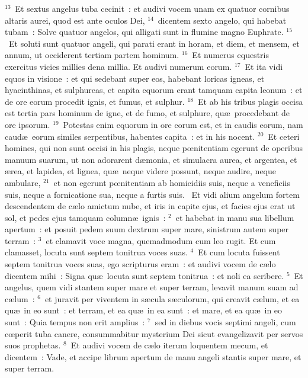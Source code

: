 ${}^{13}$~Et sextus angelus tuba cecinit~: et audivi vocem unam ex quatuor cornibus altaris aurei, quod est ante oculos Dei,
${}^{14}$~dicentem sexto angelo, qui habebat tubam~: Solve quatuor angelos, qui alligati sunt in flumine magno Euphrate.
${}^{15}$~Et soluti sunt quatuor angeli, qui parati erant in horam, et diem, et mensem, et annum, ut occiderent tertiam partem hominum.
${}^{16}$~Et numerus equestris exercitus vicies millies dena millia. Et audivi numerum eorum.
${}^{17}$~Et ita vidi equos in visione~: et qui sedebant super eos, habebant loricas igneas, et hyacinthinas, et sulphureas, et capita equorum erant tamquam capita leonum~: et de ore eorum procedit ignis, et fumus, et sulphur.
${}^{18}$~Et ab his tribus plagis occisa est tertia pars hominum de igne, et de fumo, et sulphure, qu\ae\ procedebant de ore ipsorum.
${}^{19}$~Potestas enim equorum in ore eorum est, et in caudis eorum, nam caud\ae\ eorum similes serpentibus, habentes capita~: et in his nocent.
${}^{20}$~Et ceteri homines, qui non sunt occisi in his plagis, neque pœnitentiam egerunt de operibus manuum suarum, ut non adorarent d\ae monia, et simulacra aurea, et argentea, et \ae rea, et lapidea, et lignea, qu\ae\ neque videre possunt, neque audire, neque ambulare,
${}^{21}$~et non egerunt pœnitentiam ab homicidiis suis, neque a veneficiis suis, neque a fornicatione sua, neque a furtis suis.
~Et vidi alium angelum fortem descendentem de c\ae lo amictum nube, et iris in capite ejus, et facies ejus erat ut sol, et pedes ejus tamquam column\ae\ ignis~:
${}^{2}$~et habebat in manu sua libellum apertum~: et posuit pedem suum dextrum super mare, sinistrum autem super terram~:
${}^{3}$~et clamavit voce magna, quemadmodum cum leo rugit. Et cum clamasset, locuta sunt septem tonitrua voces suas.
${}^{4}$~Et cum locuta fuissent septem tonitrua voces suas, ego scripturus eram~: et audivi vocem de c\ae lo dicentem mihi~: Signa qu\ae\ locuta sunt septem tonitrua~: et noli ea scribere.
${}^{5}$~Et angelus, quem vidi stantem super mare et super terram, levavit manum suam ad c\ae lum~:
${}^{6}$~et juravit per viventem in s\ae cula s\ae culorum, qui creavit c\ae lum, et ea qu\ae\ in eo sunt~: et terram, et ea qu\ae\ in ea sunt~: et mare, et ea qu\ae\ in eo sunt~: Quia tempus non erit amplius~:
${}^{7}$~sed in diebus vocis septimi angeli, cum cœperit tuba canere, consummabitur mysterium Dei sicut evangelizavit per servos suos prophetas.
${}^{8}$~Et audivi vocem de c\ae lo iterum loquentem mecum, et dicentem~: Vade, et accipe librum apertum de manu angeli stantis super mare, et super terram.
